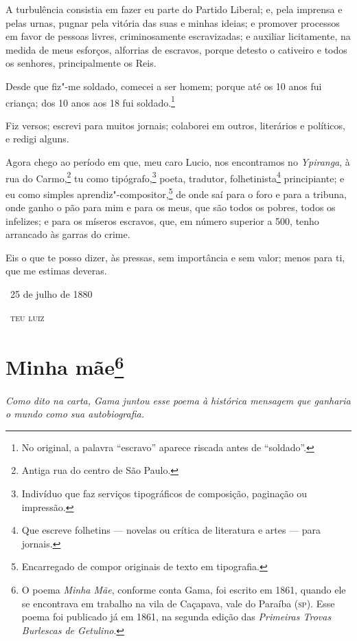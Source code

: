 A turbulência consistia em fazer eu parte do Partido Liberal; e, pela
imprensa e pelas urnas, pugnar pela vitória das suas e minhas ideias; e
promover processos em favor de pessoas livres, criminosamente
escravizadas; e auxiliar licitamente, na medida de meus esforços,
alforrias de escravos, porque detesto o cativeiro e todos os senhores,
principalmente os Reis.

Desde que fiz"-me soldado, comecei a ser homem; porque até os 10 anos fui
criança; dos 10 anos aos 18 fui soldado.\footnote{No original, a palavra ``escravo'' aparece riscada antes de ``soldado''.}

Fiz versos; escrevi para muitos jornais; colaborei em outros, literários
e políticos, e redigi alguns.

Agora chego ao período em que, meu caro Lucio, nos encontramos no
\emph{Ypiranga}, à rua do Carmo,\footnote{Antiga rua do centro de São
  Paulo.} tu como tipógrafo,\footnote{Indivíduo que faz serviços
  tipográficos de composição, paginação ou impressão.} poeta, tradutor,
folhetinista\footnote{Que escreve folhetins --- novelas ou crítica de
  literatura e artes --- para jornais.} principiante; e eu como simples
aprendiz"-compositor,\footnote{Encarregado de compor originais de texto
  em tipografia.} de onde
saí para o foro e para a tribuna, onde ganho o pão para mim e para os
meus, que são todos os pobres, todos os infelizes; e para os míseros
escravos, que, em número superior a 500, tenho arrancado às garras do
crime.

Eis o que te posso dizer, às pressas, sem importância e sem valor; menos
para ti, que me estimas deveras.

\bigskip

\hfill\ 25 de julho de 1880\smallskip

\hfill\ \textsc{teu luiz}


\chapter{Minha mãe\footnote[*]{O poema \emph{Minha Mãe}, conforme
  conta Gama, foi escrito em 1861, quando ele se encontrava em trabalho
  na vila de Caçapava, vale do Paraíba (\textsc{sp}). Esse poema foi publicado já
  em 1861, na segunda edição das \emph{Primeiras Trovas Burlescas de
  Getulino}.}}

\begin{flushleft}
{\footnotesize\itshape
Como dito na carta, Gama juntou esse poema à histórica mensagem
que ganharia o mundo como sua autobiografia. }
\end{flushleft}

